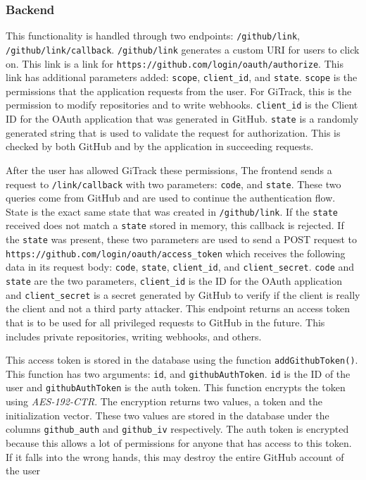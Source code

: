 \documentclass{article}
\def\code#1{\texttt{#1}}
\begin{document}
\subsubsection{Backend}
This functionality is handled through two endpoints: \code{/github/link},
\code{/github/link/callback}. \code{/github/link} generates a custom URI for
users to click on. This link is a link for
\code{https://github.com/login/oauth/authorize}. This link has additional
parameters added: \code{scope}, \code{client\_id}, and \code{state}.
\code{scope} is the permissions that the application requests from the user. For
GiTrack, this is the permission to modify repositories and to write webhooks.
\code{client\_id} is the Client ID for the OAuth application that was generated
in GitHub. \code{state} is a randomly generated string that is used to validate
the request for authorization. This is checked by both GitHub and by the
application in succeeding requests.

After the user has allowed GiTrack these permissions, The frontend sends a
request to \code{/link/callback} with two parameters: \code{code}, and
\code{state}. These two queries come from GitHub and are used to continue the
authentication flow. State is the exact same state that was created in
\code{/github/link}. If the \code{state} received does not match a \code{state}
stored in memory, this callback is rejected. If the \code{state} was present,
these two parameters are used to send a POST request to
\code{https://github.com/login/oauth/access\_token} which receives the following
data in its request body: \code{code}, \code{state}, \code{client\_id}, and
\code{client\_secret}. \code{code} and \code{state} are the two parameters,
\code{client\_id} is the ID for the OAuth application and \code{client\_secret}
is a secret generated by GitHub to verify if the client is really the client and
not a third party attacker. This endpoint returns an access token that is to be
used for all privileged requests to GitHub in the future. This includes private
repositories, writing webhooks, and others.

This access token is stored in the database using the function
\code{addGithubToken()}. This function has two arguments: \code{id}, and
\code{githubAuthToken}. \code{id} is the ID of the user and
\code{githubAuthToken} is the auth token. This function encrypts the token using
\emph{AES-192-CTR}. The encryption returns two values, a token and the
initialization vector. These two values are stored in the database under the
columns \code{github\_auth} and \code{github\_iv} respectively. The auth token
is encrypted because this allows a lot of permissions for anyone that has access
to this token. If it falls into the wrong hands, this may destroy the entire
GitHub account of the user
\end{document}
